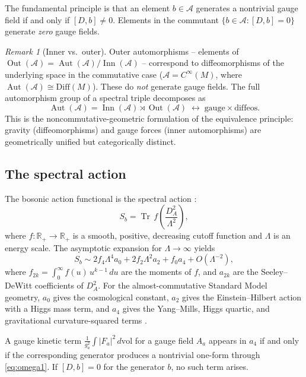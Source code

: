 \documentclass[12pt]{article}
\theoremstyle{definition}
\theoremstyle{remark}
\newtheorem{remark}[theorem]{Remark}
\newcommand{\Alg}{\mathcal{A}}
\newcommand{\Tr}{\operatorname{Tr}}
\newcommand{\Inn}{\operatorname{Inn}}
\newcommand{\Aut}{\operatorname{Aut}}
\newcommand{\Out}{\operatorname{Out}}
\begin{document}
The fundamental principle is that an element $b \in \Alg$ generates a nontrivial gauge field if and only if $[D, b] \neq 0$.  Elements in the commutant $\{b \in \Alg : [D, b] = 0\}$ generate \emph{zero} gauge fields.

\begin{remark}[Inner vs.\ outer]
Outer automorphisms -- elements of $\Out(\Alg) = \Aut(\Alg)/\Inn(\Alg)$ -- correspond to diffeomorphisms of the underlying space in the commutative case ($\Alg = C^\infty(M)$, where $\Aut(\Alg) \cong \mathrm{Diff}(M)$).  These do \emph{not} generate gauge fields.  The full automorphism group of a spectral triple decomposes as
\[
  \Aut(\Alg) = \Inn(\Alg) \rtimes \Out(\Alg) \;\longleftrightarrow\; \text{gauge} \times \text{diffeos}.
\]
This is the noncommutative-geometric formulation of the equivalence principle: gravity (diffeomorphisms) and gauge forces (inner automorphisms) are geometrically unified but categorically distinct.
\end{remark}

\subsection{The spectral action}
\label{subsec:spectralaction}

The bosonic action functional is the spectral action \cite{ChamseddineConnes1996spectral}:
\begin{equation}\label{eq:spectralaction}
  S_b = \Tr\, f\!\left(\frac{D_A^2}{\Lambda^2}\right),
\end{equation}
where $f : \mathbb{R}_+ \to \mathbb{R}_+$ is a smooth, positive, decreasing cutoff function and $\Lambda$ is an energy scale.  The asymptotic expansion for $\Lambda \to \infty$ yields
\begin{equation}\label{eq:SAexpansion}
  S_b \sim 2 f_4 \Lambda^4 a_0 + 2 f_2 \Lambda^2 a_2 + f_0 a_4 + O(\Lambda^{-2}),
\end{equation}
where $f_{2k} = \int_0^\infty f(u)\, u^{k-1}\, du$ are the moments of $f$, and $a_{2k}$ are the Seeley--DeWitt coefficients of $D_A^2$.  For the almost-commutative Standard Model geometry, $a_0$ gives the cosmological constant, $a_2$ gives the Einstein--Hilbert action with a Higgs mass term, and $a_4$ gives the Yang--Mills, Higgs quartic, and gravitational curvature-squared terms \cite{CCM2007gravity}.

A gauge kinetic term $\frac{1}{g_a^2} \int |F_a|^2\, d\mathrm{vol}$ for a gauge field $A_a$ appears in $a_4$ if and only if the corresponding generator produces a nontrivial one-form through \eqref{eq:omega1}.  If $[D, b] = 0$ for the generator $b$, no such term arises.
\end{document}
